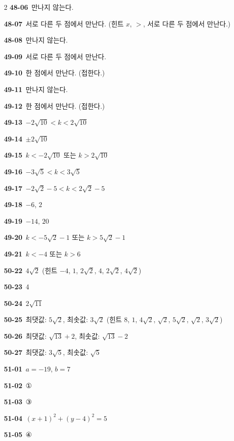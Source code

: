 \documentclass[10pt,a4paper]{article}
\begin{document}
\begin{multicols}{2}
\noindent\textbf{48-06}\ 만나지 않는다.\par
\noindent\textbf{48-07}\ 서로 다른 두 점에서 만난다. (힌트 $x$, $>$, 서로 다른 두 점에서 만난다.)\par
\noindent\textbf{48-08}\ 만나지 않는다.\par
\noindent\textbf{49-09}\ 서로 다른 두 점에서 만난다.\par
\noindent\textbf{49-10}\ 한 점에서 만난다. (접한다.)\par
\noindent\textbf{49-11}\ 만나지 않는다.\par
\noindent\textbf{49-12}\ 한 점에서 만난다. (접한다.)\par
\noindent\textbf{49-13}\ $-2\sqrt{10}<k<2\sqrt{10}$\par
\noindent\textbf{49-14}\ $\pm2\sqrt{10}$\par
\noindent\textbf{49-15}\ $k<-2\sqrt{10}$ 또는 $k>2\sqrt{10}$\par
\noindent\textbf{49-16}\ $-3\sqrt{5}<k<3\sqrt{5}$\par
\noindent\textbf{49-17}\ $-2\sqrt{2}-5<k<2\sqrt{2}-5$\par
\noindent\textbf{49-18}\ $-6$, $2$\par
\noindent\textbf{49-19}\ $-14$, $20$\par
\noindent\textbf{49-20}\ $k<-5\sqrt{2}-1$ 또는 $k>5\sqrt{2}-1$\par
\noindent\textbf{49-21}\ $k<-4$ 또는 $k>6$\par
\noindent\textbf{50-22}\ $4\sqrt{2}$ (힌트 $-4$, $1$, $2\sqrt{2}$, $4$, $2\sqrt{2}$, $4\sqrt{2}$)\par
\noindent\textbf{50-23}\ 4\par
\noindent\textbf{50-24}\ $2\sqrt{11}$\par
\noindent\textbf{50-25}\ 최댓값: $5\sqrt{2}$, 최솟값: $3\sqrt{2}$ (힌트 $8$, $1$, $4\sqrt{2}$, $\sqrt{2}$, $5\sqrt{2}$, $\sqrt{2}$, $3\sqrt{2}$)\par
\noindent\textbf{50-26}\ 최댓값: $\sqrt{13}+2$, 최솟값: $\sqrt{13}-2$\par
\noindent\textbf{50-27}\ 최댓값: $3\sqrt{5}$, 최솟값: $\sqrt{5}$\par
\noindent\textbf{51-01}\ $a=-19$, $b=7$\par
\noindent\textbf{51-02}\ ①\par
\noindent\textbf{51-03}\ ③\par
\noindent\textbf{51-04}\ $(x+1)^2+(y-4)^2=5$\par
\noindent\textbf{51-05}\ ④\par

\end{multicols}
\end{document}
